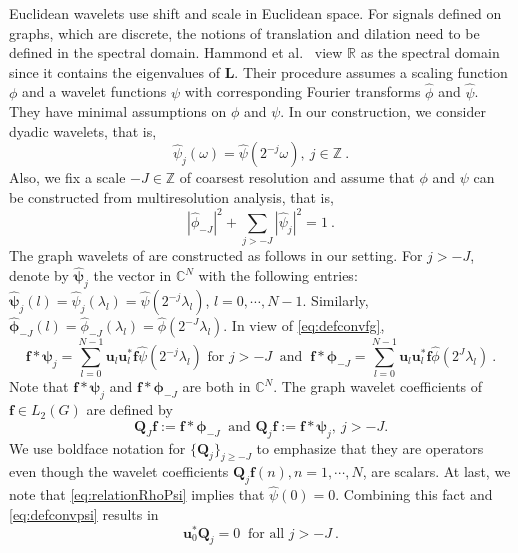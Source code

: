 \documentclass{article}
\def\l{\lambda}
\def\CC{\mathbb{C}}
\def\RR{\mathbb{R}}
\def\ZZ{\mathbb{Z}}
\def\BL{\boldsymbol{L}}
\def\BQ{\boldsymbol{Q}}
\def\Bf{\boldsymbol{f}}
\def\Bu{\boldsymbol{u}}
\def\Bphi{\hat{\boldsymbol{\phi}}}
\def\Bpsi{\hat{\boldsymbol{\psi}}}
\newcommand{\abs}[1]{\left| #1 \right|}
\begin{document}
Euclidean wavelets use shift and scale in Euclidean space. For signals defined on graphs, which are discrete, the notions of translation and dilation need to be defined in the spectral domain. Hammond et al.~\cite{HamVG11} view $\RR$ as the spectral domain since it contains the eigenvalues of $\BL$. Their procedure assumes a scaling function $\phi$ and a wavelet functions $\psi$ \cite{Dau92,Mal99} with corresponding Fourier transforms $\hat{\phi}$ and $\hat{\psi}$. They have minimal assumptions on $\phi$ and $\psi$. In our construction, we consider dyadic wavelets, that is, 
\begin{equation}
\hat{\psi}_j (\omega) = \hat{\psi}(2^{-j} \omega), ~ j \in \ZZ~.
\end{equation} 
Also, we fix a scale $-J \in \ZZ$ of coarsest resolution and assume that $\phi$ and $\psi$ can be constructed from multiresolution analysis, that is,
\begin{equation}\label{eq:relationRhoPsi}
\abs{\hat{\phi}_{-J}}^2 + \sum_{j > -J} \abs{\hat{\psi}_j}^2 = 1 ~. 
\end{equation}
The graph wavelets of \cite{HamVG11} are constructed as follows in our setting. For $j > -J$, denote by $\Bpsi_j$ the vector in $\CC^N$ with the following entries: $\Bpsi_j(l) = \hat{\psi}_j(\l_l) = \hat{\psi}(2^{-j} \l_l)$, $l = 0, \cdots, N-1$.  Similarly, $\Bphi_{-J}(l) = \hat{\phi}_{-J}(\l_l) = \hat{\phi}(2^{-J} \l_l)$. In view of \eqref{eq:defconvfg},
\begin{equation}\label{eq:defconvpsi}
\Bf \ast \boldsymbol{\psi}_j = \sum_{l=0}^{N-1} \Bu_l \Bu_l^* \Bf \hat{\psi}(2^{-j} \l_l) \text{ for } j>-J \ \text{ and } \ \Bf \ast \boldsymbol{\phi}_{-J} = \sum_{l=0}^{N-1} \Bu_l \Bu_l^* \Bf \hat{\phi}(2^{J} \l_l)~.
\end{equation}
Note that $\Bf \ast \boldsymbol{\psi}_j$ and $\Bf \ast \boldsymbol{\phi}_{-J}$ are both in $\CC^N$. 
The graph wavelet coefficients of $\Bf \in L_2(G)$ are defined by 
\begin{equation}
\BQ_J \Bf := \Bf \ast \boldsymbol{\phi}_{-J} \ \text{ and } \BQ_j \Bf := \Bf \ast \boldsymbol{\psi}_j, ~ j > -J.
\end{equation} 
We use boldface notation for $\{ \BQ_j \}_{j \geq -J}$ to emphasize that they are operators even though the wavelet coefficients $\BQ_j \Bf (n), n = 1, \cdots, N$, are scalars. At last, we note that \eqref{eq:relationRhoPsi} implies that $\hat{\psi}(0)=0$. Combining this fact and \eqref{eq:defconvpsi} results in 
\begin{equation}
\label{eq:qj_orthogonal_to_1}
 \Bu_0^* \BQ_j = 0 \ \text{ for all } j > -J ~.
\end{equation}
\end{document}
